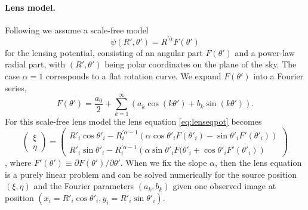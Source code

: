 \paragraph{Lens model.} Following \citet{EvansWitt} we assume a scale-free model
\begin{equation}
\psi(R',\theta') = R^{'\alpha} F(\theta') \label{eq:scalefreemodel}
\end{equation}
for the lensing potential, consisting of an angular part $F(\theta')$ and a power-law radial part, with $(R',\theta')$ being polar coordinates on the plane of the sky. The case $\alpha = 1$ corresponds to a flat rotation curve. We expand $F(\theta')$ into a Fourier series,
\begin{equation}
F(\theta') = \frac{a_0}{2} + \sum_{k=1}^{\infty} \left(a_k \cos(k\theta') + b_k \sin (k\theta') \right). \label{eq:Fourieransatz}
\end{equation}
For this scale-free lens model the lens equation \eqref{eq:lenseqpot} becomes
\begin{equation}
\begin{pmatrix} \xi \\ \eta \end{pmatrix} = \begin{pmatrix} R'_i \cos \theta'_i - R_i^{'\alpha-1} \left(\alpha \cos \theta'_i F(\theta'_i) - \sin \theta'_i F'(\theta'_i) \right) \\ R'_i \sin \theta'_i - R_i^{'\alpha-1} \left(\alpha \sin \theta'_i F(\theta'_i + \cos \theta'_i F'(\theta'_i) \right)\end{pmatrix}\label{eq:Fourierlenseq}
\end{equation}
\citep{EvansWitt}, where $F'(\theta') \equiv \partial F(\theta') / \partial \theta'$. When we fix the slope $\alpha$, then the lens equation is a purely linear problem and can be solved numerically for the source position $(\xi,\eta)$ and the Fourier parameters $(a_k,b_k)$ given one observed image at position $(x_i=R'_i \cos \theta'_i,y_i=R'_i \sin \theta'_i)$. 

